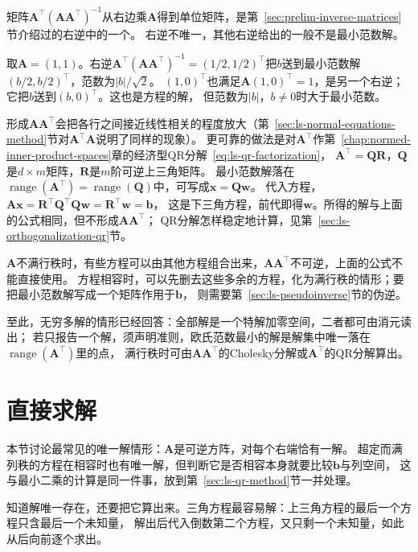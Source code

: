矩阵$\bm A^\top(\bm A\bm A^\top)^{-1}$从右边乘$\bm A$得到单位矩阵，是第~\ref{sec:prelim-inverse-matrices}节介绍过的右逆中的一个。
右逆不唯一，其他右逆给出的一般不是最小范数解。

\begin{example}[反例：其他右逆不给出最小范数解]
\label{ex:ls-other-right-inverse}
取$\bm A=(1,1)$。右逆$\bm A^\top(\bm A\bm A^\top)^{-1}=(1/2,1/2)^\top$把$b$送到最小范数解$(b/2,b/2)^\top$，范数为$|b|/\sqrt2$。
$(1,0)^\top$也满足$\bm A(1,0)^\top=1$，是另一个右逆；它把$b$送到$(b,0)^\top$。这也是方程的解，
但范数为$|b|$，$b\neq0$时大于最小范数。
\end{example}

形成$\bm A\bm A^\top$会把各行之间接近线性相关的程度放大（第~\ref{sec:ls-normal-equations-method}节对$\bm A^\top\bm A$说明了同样的现象）。
更可靠的做法是对$\bm A^\top$作第~\ref{chap:normed-inner-product-spaces}章的经济型QR分解~\eqref{eq:ls-qr-factorization}，
$\bm A^\top=\bm Q\bm R$，$\bm Q$是$d\times m$矩阵，$\bm R$是$m$阶可逆上三角矩阵。
最小范数解落在$\operatorname{range}(\bm A^\top)=\operatorname{range}(\bm Q)$中，可写成$\bm x=\bm Q\bm w$。
代入方程，$\bm A\bm x=\bm R^\top\bm Q^\top\bm Q\bm w=\bm R^\top\bm w=\bm b$，
这是下三角方程，前代即得$\bm w$。所得的解与上面的公式相同，但不形成$\bm A\bm A^\top$；
QR分解怎样稳定地计算，见第~\ref{sec:ls-orthogonalization-qr}节。

$\bm A$不满行秩时，有些方程可以由其他方程组合出来，$\bm A\bm A^\top$不可逆，上面的公式不能直接使用。
方程相容时，可以先删去这些多余的方程，化为满行秩的情形；要把最小范数解写成一个矩阵作用于$\bm b$，
则需要第~\ref{sec:ls-pseudoinverse}节的伪逆。

至此，无穷多解的情形已经回答：全部解是一个特解加零空间，二者都可由消元读出；
若只报告一个解，须声明准则，欧氏范数最小的解是解集中唯一落在$\operatorname{range}(\bm A^\top)$里的点，
满行秩时可由$\bm A\bm A^\top$的Cholesky分解或$\bm A^\top$的QR分解算出。
\section{直接求解}
\label{sec:ls-direct-methods}
\label{sec:linear-algebra-direct-exact}
\label{sec:matrix-analysis-stable-solvers}

本节讨论最常见的唯一解情形：$\bm A$是可逆方阵，对每个右端恰有一解。
超定而满列秩的方程在相容时也有唯一解，但判断它是否相容本身就要比较$\bm b$与列空间，
这与最小二乘的计算是同一件事，放到第~\ref{sec:ls-qr-method}节一并处理。

知道解唯一存在，还要把它算出来。三角方程最容易解：上三角方程的最后一个方程只含最后一个未知量，
解出后代入倒数第二个方程，又只剩一个未知量，如此从后向前逐个求出。

